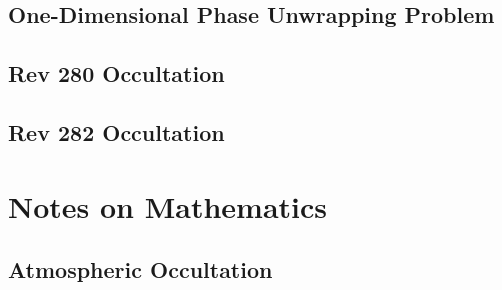 \documentclass[oneside]{book}
\theoremstyle{mystyle}
\begin{document}
\section{One-Dimensional Phase Unwrapping Problem}
\section{Rev 280 Occultation}
\section{Rev 282 Occultation}
\chapter{Notes on Mathematics}
\section{Atmospheric Occultation}
\end{document}
